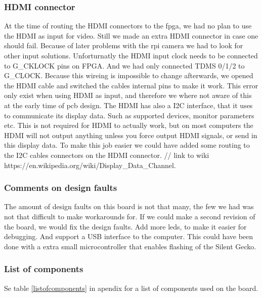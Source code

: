 \subsubsection{HDMI connector}
At the time of routing the HDMI connectors to the fpga, we had no plan to use the HDMI as input for video. Still we made an extra HDMI connector in case one should fail. 
Because of later problems with the rpi camera we had to look for other input solutions. Unforturnatly the HDMI input clock \+\/\- needs to be connected to G\_CKLOCK pins on FPGA. And we had only connected TDMS 0/1/2 \+\/\- to G\_CLOCK. Because this wireing is impossible to change afterwards, we opened the HDMI cable and switched the cables internal pins to make it work. This error only exist when using HDMI as input, and therefore we where not aware of this at the early time of pcb design. 
The HDMI has also a I2C interface, that it uses to communicate its display data. Such as supported devices, monitor parameters etc. This is not required for HDMI to actually work, but on most computers the HDMI will not output anything unless you force output HDMI signals, or send in this display data. To make this job easier we could have added some routing to the I2C cables connectors on the HDMI connector. // link to wiki https://en.wikipedia.org/wiki/Display\_Data\_Channel.
\subsubsection{Comments on design faults}
The amount of design faults on this board is not that many, the few we had was not that difficult to make workarounds for. If we could make a second revision of the board, we would fix the design faults. Add more leds, to make it easier for debugging. And support a USB interface to the computer. This could have been done with a extra small microcontroller that enables flashing of the Silent Gecko.

\subsubsection{List of components}
Se table \ref{listofcomponents} in apendix for a list of components used on the board.
